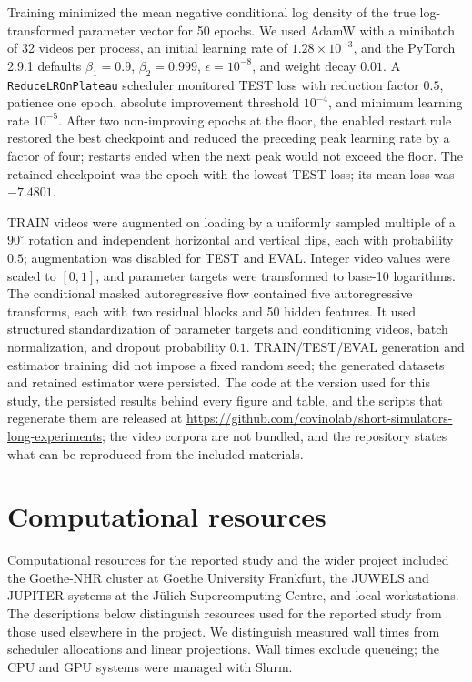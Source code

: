 \documentclass{article}
\newcommand{\repourl}{https://github.com/covinolab/short-simulators-long-experiments}
\begin{document}
Training minimized the mean negative conditional log density of the true
log-transformed parameter vector for 50 epochs. We used AdamW with a minibatch
of 32 videos per process, an initial learning rate of $1.28\times10^{-3}$,
and the PyTorch 2.9.1 defaults $\beta_1=0.9$, $\beta_2=0.999$,
$\epsilon=10^{-8}$, and weight decay $0.01$. A
\texttt{ReduceLROnPlateau} scheduler monitored TEST loss with reduction factor
$0.5$, patience one epoch, absolute improvement threshold $10^{-4}$, and
minimum learning rate $10^{-5}$. After two non-improving epochs at the floor, the
enabled restart rule restored the best checkpoint and reduced the preceding
peak learning rate by a factor of four; restarts ended when the next peak
would not exceed the floor. The retained checkpoint was the epoch with the
lowest TEST loss; its mean loss was $-7.4801$.

TRAIN videos were augmented on loading by a uniformly sampled multiple of a
$90^\circ$ rotation and independent horizontal and vertical flips, each with
probability $0.5$; augmentation was disabled for TEST and EVAL. Integer video
values were scaled to $[0,1]$, and parameter targets were transformed to base-10
logarithms. The conditional masked autoregressive flow contained five
autoregressive transforms, each with two residual blocks and 50 hidden
features. It used structured standardization of parameter targets and
conditioning videos, batch normalization, and dropout probability $0.1$.
TRAIN/TEST/EVAL generation and estimator training did not impose a fixed random seed;
the generated datasets and retained estimator were persisted. The code at
the version used for this study, the persisted results behind every figure
and table, and the scripts that regenerate them are released at
\url{\repourl}; the video corpora are not bundled, and the repository states
what can be reproduced from the included materials.

\newpage
\section{Computational resources}
\label{app:compute}

Computational resources for the reported study and the wider project
included the Goethe-NHR cluster at Goethe University Frankfurt, the JUWELS and
JUPITER systems at the J\"ulich Supercomputing Centre, and local
workstations. The descriptions below distinguish resources used for the
reported study from those used elsewhere in the project. We distinguish
measured wall times from scheduler allocations and linear projections. Wall
times exclude queueing; the CPU and GPU systems were managed with Slurm.
\end{document}
